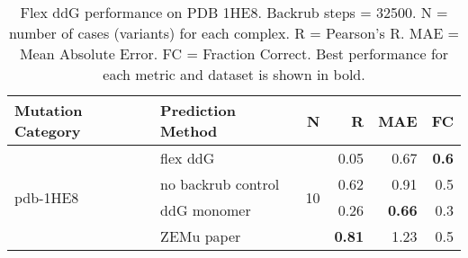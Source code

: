 \begin{table}
  \begin{tabular}{llrrrr}
\toprule
Mutation Category &   Prediction Method &   N &    R &  MAE &  FC \\
\midrule
 \multirow{ 4}{*}{pdb-1HE8} & flex ddG & \multirow{ 4}{*}{10} & 0.05 & 0.67 & \textbf{0.6}  \\
 & no backrub control & & 0.62 & 0.91 & 0.5  \\
 & ddG monomer & & 0.26 & \textbf{0.66} & 0.3  \\
 & ZEMu paper & & \textbf{0.81} & 1.23 & 0.5  \\
\bottomrule
\end{tabular}
  \caption[Flex ddG performance on PDB 1HE8]{
    Flex ddG performance on PDB 1HE8. Backrub steps = 32500. N = number of cases (variants) for each complex. R = Pearson's R. MAE = Mean Absolute Error. FC = Fraction Correct. Best performance for each metric and dataset is shown in bold.
  } \label{tab:table-pdb-1HE8}
\end{table}
